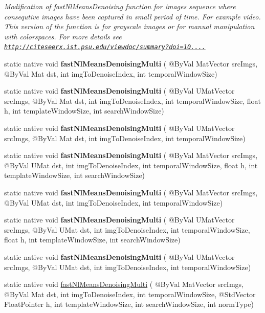 \begin{DoxyCompactItemize}
\begin{DoxyCompactList}\small\item\em Modification of fast\+Nl\+Means\+Denoising function for images sequence where consequtive images have been captured in small period of time. For example video. This version of the function is for grayscale images or for manual manipulation with colorspaces. For more details see \href{http://citeseerx.ist.psu.edu/viewdoc/summary?doi=10.1.1.131.6394}{\tt http\+://citeseerx.\+ist.\+psu.\+edu/viewdoc/summary?doi=10....} \end{DoxyCompactList}\item 
static native void {\bfseries fast\+Nl\+Means\+Denoising\+Multi} ( @By\+Val Mat\+Vector src\+Imgs, @By\+Val Mat dst, int img\+To\+Denoise\+Index, int temporal\+Window\+Size)
\item 
static native void {\bfseries fast\+Nl\+Means\+Denoising\+Multi} ( @By\+Val U\+Mat\+Vector src\+Imgs, @By\+Val Mat dst, int img\+To\+Denoise\+Index, int temporal\+Window\+Size, float h, int template\+Window\+Size, int search\+Window\+Size)
\item 
static native void {\bfseries fast\+Nl\+Means\+Denoising\+Multi} ( @By\+Val U\+Mat\+Vector src\+Imgs, @By\+Val Mat dst, int img\+To\+Denoise\+Index, int temporal\+Window\+Size)
\item 
static native void {\bfseries fast\+Nl\+Means\+Denoising\+Multi} ( @By\+Val Mat\+Vector src\+Imgs, @By\+Val U\+Mat dst, int img\+To\+Denoise\+Index, int temporal\+Window\+Size, float h, int template\+Window\+Size, int search\+Window\+Size)
\item 
static native void {\bfseries fast\+Nl\+Means\+Denoising\+Multi} ( @By\+Val Mat\+Vector src\+Imgs, @By\+Val U\+Mat dst, int img\+To\+Denoise\+Index, int temporal\+Window\+Size)
\item 
static native void {\bfseries fast\+Nl\+Means\+Denoising\+Multi} ( @By\+Val U\+Mat\+Vector src\+Imgs, @By\+Val U\+Mat dst, int img\+To\+Denoise\+Index, int temporal\+Window\+Size, float h, int template\+Window\+Size, int search\+Window\+Size)
\item 
static native void {\bfseries fast\+Nl\+Means\+Denoising\+Multi} ( @By\+Val U\+Mat\+Vector src\+Imgs, @By\+Val U\+Mat dst, int img\+To\+Denoise\+Index, int temporal\+Window\+Size)
\item 
static native void \hyperlink{group__photo__denoise_ga754f5006e8d8b4b484b29d01a8a993da}{fast\+Nl\+Means\+Denoising\+Multi} ( @By\+Val Mat\+Vector src\+Imgs, @By\+Val Mat dst, int img\+To\+Denoise\+Index, int temporal\+Window\+Size, @Std\+Vector Float\+Pointer h, int template\+Window\+Size, int search\+Window\+Size, int norm\+Type)

\end{DoxyCompactItemize}

